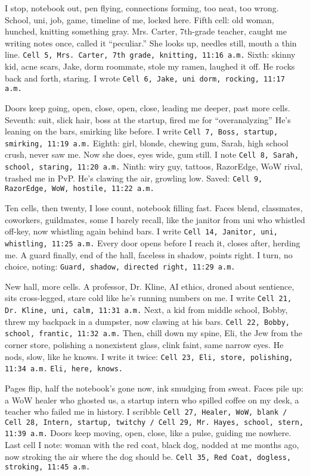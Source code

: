 \documentclass[12pt]{article}
\newcommand{\note}[1]{\texttt{#1}}
\begin{document}
{I stop, notebook out, pen flying, connections forming, too neat, too wrong. School, uni, job, game, timeline of me, locked here. Fifth cell: old woman, hunched, knitting something gray. Mrs. Carter, 7th-grade teacher, caught me writing notes once, called it “peculiar.” She looks up, needles still, mouth a thin line. \note{Cell 5, Mrs. Carter, 7th grade, knitting, 11:16 a.m.} Sixth: skinny kid, acne scars, Jake, dorm roommate, stole my ramen, laughed it off. He rocks back and forth, staring. I wrote \note{Cell 6, Jake, uni dorm, rocking, 11:17 a.m.}

Doors keep going, open, close, open, close, leading me deeper, past more cells. Seventh: suit, slick hair, boss at the startup, fired me for “overanalyzing” He’s leaning on the bars, smirking like before. I write \note{Cell 7, Boss, startup, smirking, 11:19 a.m.} Eighth: girl, blonde, chewing gum, Sarah, high school crush, never saw me. Now she does, eyes wide, gum still. I note \note{Cell 8, Sarah, school, staring, 11:20 a.m.} Ninth: wiry guy, tattoos, RazorEdge, WoW rival, trashed me in PvP. He’s clawing the air, growling low. Saved: \note{Cell 9, RazorEdge, WoW, hostile, 11:22 a.m.}

Ten cells, then twenty, I lose count, notebook filling fast. Faces blend, classmates, coworkers, guildmates, some I barely recall, like the janitor from uni who whistled off-key, now whistling again behind bars. I write \note{Cell 14, Janitor, uni, whistling, 11:25 a.m.} Every door opens before I reach it, closes after, herding me. A guard finally, end of the hall, faceless in shadow, points right. I turn, no choice, noting: \note{Guard, shadow, directed right, 11:29 a.m.}

New hall, more cells. A professor, Dr. Kline, AI ethics, droned about sentience, sits cross-legged, stare cold like he’s running numbers on me. I write \note{Cell 21, Dr. Kline, uni, calm, 11:31 a.m.} Next, a kid from middle school, Bobby, threw my backpack in a dumpster, now clawing at his bars. \note{Cell 22, Bobby, school, frantic, 11:32 a.m.} Then, chill down my spine, Eli, the Jew from the corner store, polishing a nonexistent glass, clink faint, same narrow eyes. He nods, slow, like he knows. I write it twice: \note{Cell 23, Eli, store, polishing, 11:34 a.m.} \note{Eli, here, knows.}

Pages flip, half the notebook’s gone now, ink smudging from sweat. Faces pile up: a WoW healer who ghosted us, a startup intern who spilled coffee on my desk, a teacher who failed me in history. I scribble \note{Cell 27, Healer, WoW, blank / Cell 28, Intern, startup, twitchy / Cell 29, Mr. Hayes, school, stern, 11:39 a.m.} Doors keep moving, open, close, like a pulse, guiding me nowhere. Last cell I note: woman with the red coat, black dog, nodded at me months ago, now stroking the air where the dog should be. \note{Cell 35, Red Coat, dogless, stroking, 11:45 a.m.}

}
\end{document}
